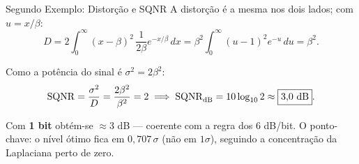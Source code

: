 \begin{frame}{Segundo Exemplo: Distorção e SQNR}
  A distorção é a mesma nos dois lados; com $u = x/\beta$:
  \[
    D = 2\int_0^\infty (x-\beta)^2\,\frac{1}{2\beta}e^{-x/\beta}\,dx
      = \beta^2\!\int_0^\infty (u-1)^2 e^{-u}\,du
      = \beta^2 .
  \]

  \vspace{0.1cm}
  Como a potência do sinal é $\sigma^2 = 2\beta^2$:
  \[
    \SQNR = \frac{\sigma^2}{D} = \frac{2\beta^2}{\beta^2} = 2
    \;\Longrightarrow\;
    \SQNR_{\mathrm{dB}} = 10\log_{10} 2 \approx \boxed{3{,}0\ \text{dB}}.
  \]

  \vspace{0.15cm}
  \begin{block}{}
  \footnotesize Com \textbf{1 bit} obtém-se $\approx 3$ dB — coerente com a
  regra dos 6 dB/bit. O ponto-chave: o nível ótimo fica em $0{,}707\,\sigma$
  (não em $1\sigma$), seguindo a concentração da Laplaciana perto de zero.
  \end{block}
\end{frame}


